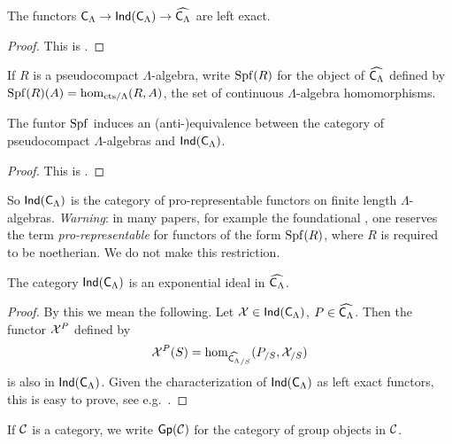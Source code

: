 \begin{lemma}\label{lem:ind-cat-left-exact}
The functors $\mathsf{C}_\Lambda \to \operatorname{\mathsf{Ind}}(\mathsf{C}_\Lambda) \to \widehat{\mathsf{C}_\Lambda}$ 
are left exact.
\end{lemma}
\begin{proof}
This is \cite[6.1.17]{kashiwara-schapira-2006}. 
\end{proof}

If $R$ is a pseudocompact $\Lambda$-algebra, write $\operatorname{Spf}(R)$ for the object of 
$\widehat{\mathsf{C}_\Lambda}$ defined by $\operatorname{Spf}(R)(A)=\hom_{\mathrm{cts}/\Lambda}(R,A)$, 
the set of continuous $\Lambda$-algebra homomorphisms. 

\begin{lemma}
The funtor $\operatorname{Spf}$ induces an (anti-)equivalence between the category of 
pseudocompact $\Lambda$-algebras and $\operatorname{\mathsf{Ind}}(\mathsf{C}_\Lambda)$. 
\end{lemma}
\begin{proof}
This is \cite[VII\textsubscript{B} 0.4.2 Prop.]{sga3-1}. 
\end{proof}

So $\operatorname{\mathsf{Ind}}(\mathsf{C}_\Lambda)$ is the category of pro-representable 
functors on finite length $\Lambda$-algebras. \emph{Warning}: in many papers, 
for example the foundational \cite{mazur-1995}, one reserves the term 
\emph{pro-representable} for functors of the form $\operatorname{Spf}(R)$, where $R$ is 
required to be noetherian. We do not make this restriction. 

\begin{lemma}\label{thm:exponential-ideal}
The category $\operatorname{\mathsf{Ind}}(\mathsf{C}_\Lambda)$ is an exponential ideal in 
$\widehat{\mathsf{C}_\Lambda}$. 
\end{lemma}
\begin{proof}
By this we mean the following. Let $\mathcal{X}\in \operatorname{\mathsf{Ind}}(\mathsf{C}_\Lambda)$, 
$P\in \widehat{\mathsf{C}_\Lambda}$. Then the functor $\mathcal{X}^P$ defined by 
\[
	\mathcal{X}^P(S) = \hom_{\widehat{\mathsf{C}_\Lambda}_{/S}}(P_{/S},\mathcal{X}_{/S}) 
\]
is also in $\operatorname{\mathsf{Ind}}(\mathsf{C}_\Lambda)$. Given the characterization of 
$\operatorname{\mathsf{Ind}}(\mathsf{C}_\Lambda)$ as left exact functors, this is easy to 
prove, see e.g.~\cite[4.2.3]{johnstone-2002}. 
\end{proof}

If $\mathcal{C}$ is a category, we write $\operatorname{\mathsf{Gp}}(\mathcal{C})$ for the category of group 
objects in $\mathcal{C}$. 

